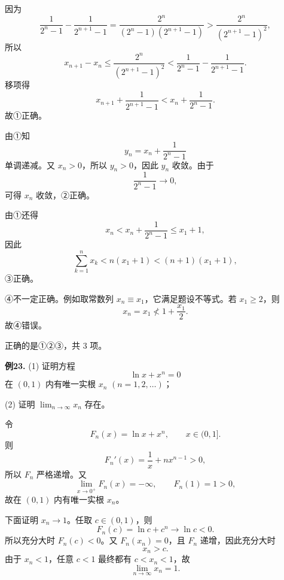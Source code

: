 \begin{solutionblock}

因为
\[
\frac1{2^n-1}-\frac1{2^{n+1}-1}
=\frac{2^n}{(2^n-1)(2^{n+1}-1)}
>
\frac{2^n}{(2^{n+1}-1)^2},
\]
所以
\[
x_{n+1}-x_n
\le \frac{2^n}{(2^{n+1}-1)^2}
<
\frac1{2^n-1}-\frac1{2^{n+1}-1}.
\]
移项得
\[
x_{n+1}+\frac1{2^{n+1}-1}
<
x_n+\frac1{2^n-1}.
\]
故①正确。

由①知
\[
y_n=x_n+\frac1{2^n-1}
\]
单调递减。又 \(x_n>0\)，所以 \(y_n>0\)，因此 \(y_n\) 收敛。由于
\[
\frac1{2^n-1}\to0,
\]
可得 \(x_n\) 收敛，②正确。

由①还得
\[
x_n<x_n+\frac1{2^n-1}\le x_1+1,
\]
因此
\[
\sum_{k=1}^n x_k<n(x_1+1)<(n+1)(x_1+1),
\]
③正确。

④不一定正确。例如取常数列 \(x_n\equiv x_1\)，它满足题设不等式。若 \(x_1\ge2\)，则
\[
x_n=x_1\not<1+\frac{x_1}{2}.
\]
故④错误。

正确的是①②③，共 3 项。

\end{solutionblock}

\begin{problemblock}
\textbf{例23.} (1) 证明方程
\[
\ln x+x^n=0
\]
在 \((0,1)\) 内有唯一实根 \(x_n\) \((n=1,2,\dots)\)；

(2) 证明 \(\displaystyle\lim_{n\to\infty}x_n\) 存在。
\end{problemblock}

\begin{solutionblock}

令
\[
F_n(x)=\ln x+x^n,\qquad x\in(0,1].
\]
则
\[
F_n'(x)=\frac1x+nx^{n-1}>0,
\]
所以 \(F_n\) 严格递增。又
\[
\lim_{x\to0^+}F_n(x)=-\infty,\qquad F_n(1)=1>0,
\]
故在 \((0,1)\) 内有唯一实根 \(x_n\)。

下面证明 \(x_n\to1\)。任取 \(c\in(0,1)\)，则
\[
F_n(c)=\ln c+c^n\to\ln c<0.
\]
所以充分大时 \(F_n(c)<0\)。又 \(F_n(x_n)=0\)，且 \(F_n\) 递增，因此充分大时
\[
x_n>c.
\]
由于 \(x_n<1\)，任意 \(c<1\) 最终都有 \(c<x_n<1\)，故
\[
\lim_{n\to\infty}x_n=1.
\]

\end{solutionblock}

